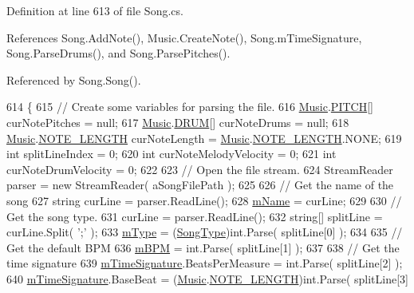 Definition at line 613 of file Song.\+cs.



References Song.\+Add\+Note(), Music.\+Create\+Note(), Song.\+m\+Time\+Signature, Song.\+Parse\+Drums(), and Song.\+Parse\+Pitches().



Referenced by Song.\+Song().


\begin{DoxyCode}
614     \{
615         \textcolor{comment}{// Create some variables for parsing the file.}
616         \hyperlink{class_music}{Music}.\hyperlink{group___music_enums_ga508f69b199ea518f935486c990edac1d}{PITCH}[] curNotePitches = null;
617         \hyperlink{class_music}{Music}.\hyperlink{group___music_enums_gade475b4382c7066d1af13e7c13c029b6}{DRUM}[] curNoteDrums = null;
618         \hyperlink{class_music}{Music}.\hyperlink{group___music_enums_gaf11b5f079adbb21c800b9eca1c5c3cbd}{NOTE\_LENGTH} curNoteLength = \hyperlink{class_music}{Music}.\hyperlink{group___music_enums_gaf11b5f079adbb21c800b9eca1c5c3cbd}{NOTE\_LENGTH}.NONE;
619         \textcolor{keywordtype}{int} splitLineIndex = 0;
620         \textcolor{keywordtype}{int} curNoteMelodyVelocity = 0;
621         \textcolor{keywordtype}{int} curNoteDrumVelocity = 0;
622 
623         \textcolor{comment}{// Open the file stream.}
624         StreamReader parser = \textcolor{keyword}{new} StreamReader( aSongFilePath );
625 
626         \textcolor{comment}{// Get the name of the song}
627         \textcolor{keywordtype}{string} curLine = parser.ReadLine();
628         \hyperlink{group___song_priv_var_ga6a5e6c1e4aa92939e2b5c1e3d9908df8}{mName} = curLine;
629 
630         \textcolor{comment}{// Get the song type.}
631         curLine = parser.ReadLine();
632         \textcolor{keywordtype}{string}[] splitLine = curLine.Split( \textcolor{charliteral}{';'} );
633         \hyperlink{group___song_priv_var_gaf3b9d0f461522324f897b746311b43c5}{mType} = (\hyperlink{group___song_enums_gae681a1f001333e39fc1cb4fea97bfe1b}{SongType})\textcolor{keywordtype}{int}.Parse( splitLine[0] );
634 
635         \textcolor{comment}{// Get the default BPM}
636         \hyperlink{group___song_priv_var_ga3341fbbd9c0c58fe6514623e6b6c5a1e}{mBPM} = \textcolor{keywordtype}{int}.Parse( splitLine[1] );
637 
638         \textcolor{comment}{// Get the time signature}
639         \hyperlink{group___song_priv_var_ga2b2dcc0e83e49f7303b6a1371877b25e}{mTimeSignature}.BeatsPerMeasure = \textcolor{keywordtype}{int}.Parse( splitLine[2] );
640         \hyperlink{group___song_priv_var_ga2b2dcc0e83e49f7303b6a1371877b25e}{mTimeSignature}.BaseBeat = (\hyperlink{class_music}{Music}.\hyperlink{group___music_enums_gaf11b5f079adbb21c800b9eca1c5c3cbd}{NOTE\_LENGTH})\textcolor{keywordtype}{int}.Parse( splitLine[3] 

\end{DoxyCode}
